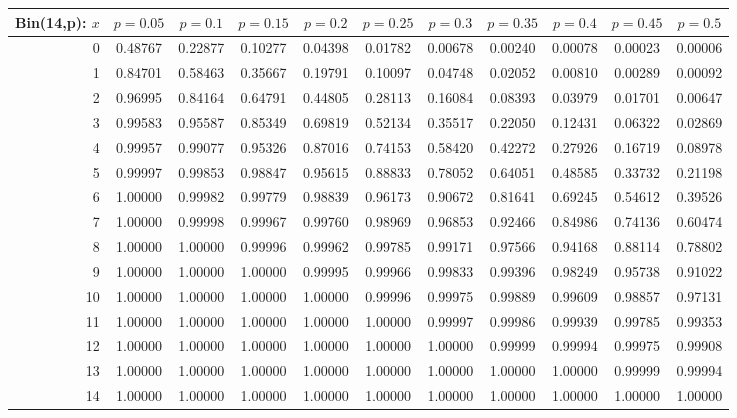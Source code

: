 \vspace{8pt minus 6pt}
\begin{tabular}{@{\extracolsep{-2pt}}|r|c|c|c|c|c|c|c|c|c|c|}
\hline
Bin(14,p): $x$
   & $p\!=\!0.05$& $p\!=\!0.1$& $p\!=\!0.15$& $p\!=\!0.2$& $p\!=\!0.25$& $p\!=\!0.3$& $p\!=\!0.35$& $p\!=\!0.4$& $p\!=\!0.45$& $p\!=\!0.5$\\\hline
  0&0.48767&0.22877&0.10277&0.04398&0.01782&0.00678&0.00240&0.00078&0.00023&0.00006\\
  1&0.84701&0.58463&0.35667&0.19791&0.10097&0.04748&0.02052&0.00810&0.00289&0.00092\\
  2&0.96995&0.84164&0.64791&0.44805&0.28113&0.16084&0.08393&0.03979&0.01701&0.00647\\
  3&0.99583&0.95587&0.85349&0.69819&0.52134&0.35517&0.22050&0.12431&0.06322&0.02869\\
  4&0.99957&0.99077&0.95326&0.87016&0.74153&0.58420&0.42272&0.27926&0.16719&0.08978\\
  5&0.99997&0.99853&0.98847&0.95615&0.88833&0.78052&0.64051&0.48585&0.33732&0.21198\\
  6&1.00000&0.99982&0.99779&0.98839&0.96173&0.90672&0.81641&0.69245&0.54612&0.39526\\
  7&1.00000&0.99998&0.99967&0.99760&0.98969&0.96853&0.92466&0.84986&0.74136&0.60474\\
  8&1.00000&1.00000&0.99996&0.99962&0.99785&0.99171&0.97566&0.94168&0.88114&0.78802\\
  9&1.00000&1.00000&1.00000&0.99995&0.99966&0.99833&0.99396&0.98249&0.95738&0.91022\\
 10&1.00000&1.00000&1.00000&1.00000&0.99996&0.99975&0.99889&0.99609&0.98857&0.97131\\
 11&1.00000&1.00000&1.00000&1.00000&1.00000&0.99997&0.99986&0.99939&0.99785&0.99353\\
 12&1.00000&1.00000&1.00000&1.00000&1.00000&1.00000&0.99999&0.99994&0.99975&0.99908\\
 13&1.00000&1.00000&1.00000&1.00000&1.00000&1.00000&1.00000&1.00000&0.99999&0.99994\\
 14&1.00000&1.00000&1.00000&1.00000&1.00000&1.00000&1.00000&1.00000&1.00000&1.00000\\
\hline
\end{tabular}

